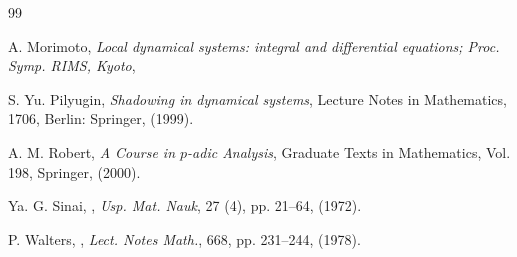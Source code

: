 \documentclass[a4paper, 12pt]{article}
\theoremstyle{definition}
\begin{document}
\begin{thebibliography}{99}
		
		A. Morimoto, 
		\textit{Local dynamical systems: integral and differential equations; {Proc}. {Symp}. {RIMS}, {Kyoto}}, 
		
		
		S. Yu. Pilyugin,
		\textit{Shadowing in dynamical systems}, Lecture Notes in Mathematics, 1706, Berlin: Springer, (1999).
		
		
		A. M. Robert,
		\textit{A Course in $p$-adic Analysis}, Graduate Texts in Mathematics, Vol. 198, Springer, (2000). 
		
		Ya. G. Sinai, 
		,
		\textit{Usp. Mat. Nauk}, 27 (4), pp. 21--64, (1972).
		
		
		P. Walters, 
		, \textit{Lect. Notes Math.}, 668, pp. 231--244, (1978). 
		
		
		
		
	\end{thebibliography}
	
	
	
	
	
\end{document}
